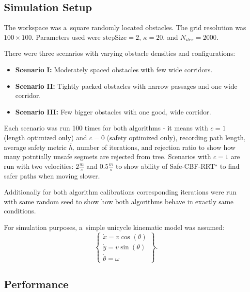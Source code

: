 \documentclass{svproc}
\begin{document}
\subsection{Simulation Setup}
The workspace was a~square randomly located obstacles. The grid resolution was
$100\times100$. Parameters used were $\text{stepSize}=2$, $\kappa=20$, and
$N_{iter}=2000$.

There were three scenarios with varying obstacle densities and configurations:
\begin{itemize}
    \item \textbf{Scenario I:} Moderately spaced obstacles with few wide corridors.
    \item \textbf{Scenario II:} Tightly packed obstacles with narrow passages
    and one wide corridor.
    \item \textbf{Scenario III:} Few bigger obstacles with one good, wide corridor.
\end{itemize}
Each scenario was run 100 times for both algorithms - it means with $c=1$
(length optimized only) and $c = 0$ (safety optimized only), recording path length,
average safety metric $\bar h$, number of iterations, and rejection ratio to
show how many potntially unsafe segmets are rejected from tree. Scenarios with
$c=1$ are run with two velocities: $2 \frac{m}{s}$ and $0.5 \frac{m}{s}$ to show
ability of Safe-CBF-RRT$^\star$ to find safer paths when moving slower.

Additionally for both algorithm calibrations corresponding iterations were run
with same random seed to show how both algorithms behave in exactly same
conditions.

For simulation purposes, a~simple unicycle kinematic model was assumed:
\begin{equation}
    \left\{
    \begin{array}{c}   
        \dot{x} = v \cos(\theta)\\
        \dot{y} = v \sin(\theta)\\
        \dot{\theta} = \omega
    \end{array}
    \right\}
    .
\end{equation}
\subsection{Performance}
\end{document}
